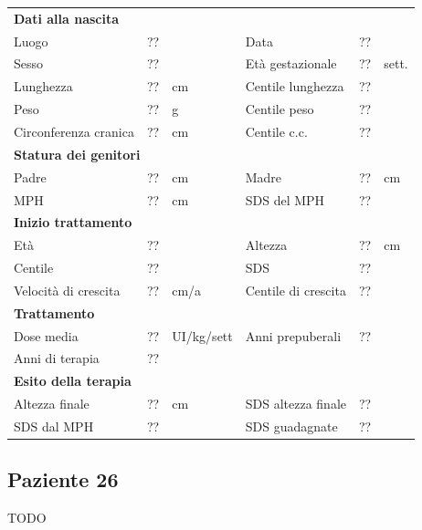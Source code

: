 \begin{table}[!h]
\begin{tabular}{lrllrl}
\toprule
\multicolumn{6}{l}{\textbf{Dati alla nascita}}\\
Luogo 		& \multicolumn{2}{l}{??} 	& Data 					& \multicolumn{2}{l}{??} 	\\
Sesso 		& \multicolumn{2}{l}{??} 	& Età gestazionale 		& ?? 		& sett.\\
Lunghezza 	& ?? 		& cm 				& Centile lunghezza		& ?? 		\\
Peso 		& ?? 		& g					& Centile peso			& ?? 		\\
Circonferenza cranica	& ?? 		& cm 	& Centile c.c.			& ?? \\
\midrule
\multicolumn{6}{l}{\textbf{Statura dei genitori}}\\
Padre 		& ?? & cm 	& Madre 				& ?? & cm \\
MPH 		& ?? & cm 	& SDS del MPH 			& ??\\
\midrule
\multicolumn{6}{l}{\textbf{Inizio trattamento}} \\
Età	& ?? & 		& Altezza 				& ?? & cm  \\
Centile & ?? 	 &		& SDS		& ?? \\
Velocità di crescita & ?? & cm/a	& Centile di crescita & ??\\
\midrule
\multicolumn{6}{l}{\textbf{Trattamento}} \\
Dose media		& ?? & UI/kg/sett & Anni prepuberali & ??\\
Anni di terapia & ??\\
\midrule
\multicolumn{6}{l}{\textbf{Esito della terapia}} \\
Altezza finale			& ?? & cm 	& SDS altezza finale		& ??\\
SDS dal MPH				& ?? &		& SDS guadagnate 			& ??\\
\bottomrule
\end{tabular}
\end{table}
\clearpage


\subsection*{Paziente 26}

TODO

